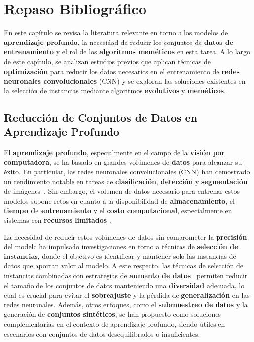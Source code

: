 
\chapter{Repaso Bibliográfico}\label{ch:repaso-bibliografico}
En este capítulo se revisa la literatura relevante en torno a los modelos de \textbf{aprendizaje profundo}, la
necesidad de reducir los conjuntos de \textbf{datos de entrenamiento} y el rol de los \textbf{algoritmos meméticos} en
esta tarea.
A lo largo de este capítulo, se analizan estudios previos que aplican técnicas de \textbf{optimización} para reducir
los datos necesarios en el entrenamiento de \textbf{redes neuronales convolucionales} (CNN) y se exploran las
soluciones existentes en la selección de instancias mediante algoritmos \textbf{evolutivos} y \textbf{meméticos}.


\section{Reducción de Conjuntos de Datos en Aprendizaje Profundo}
\label{sec:reduccion-de-conjuntos-de-datos-en-aprendizaje-profundo}
El \textbf{aprendizaje profundo}, especialmente en el campo de la \textbf{visión por computadora}, se ha basado en
grandes volúmenes de \textbf{datos} para alcanzar su éxito.
En particular, las redes neuronales convolucionales (CNN) han demostrado un rendimiento notable en tareas de
\textbf{clasificación}, \textbf{detección} y \textbf{segmentación} de imágenes~\cite{goodfellowDeepLearning2016}.
Sin embargo, el volumen de datos necesario para entrenar estos modelos supone retos en cuanto a la disponibilidad de
\textbf{almacenamiento}, el \textbf{tiempo de entrenamiento} y el \textbf{costo computacional}, especialmente en
sistemas con \textbf{recursos limitados}~\cite{lecunDeepLearning2015}.


La necesidad de reducir estos volúmenes de datos sin comprometer la \textbf{precisión} del modelo ha impulsado
investigaciones en torno a técnicas de \textbf{selección de instancias}, donde el objetivo es identificar y mantener
solo las instancias de datos que aportan valor al modelo.
A este respecto, las técnicas de selección de instancias combinadas con estrategias de
\textbf{aumento de datos}~\cite{shortenSurveyImageData2019} permiten reducir el tamaño de los conjuntos de datos
manteniendo una \textbf{diversidad} adecuada, lo cual es crucial para evitar el \textbf{sobreajuste} y la pérdida de
\textbf{generalización} en las redes neuronales.
Además, otros enfoques, como el \textbf{submuestreo de datos} y la generación de \textbf{conjuntos sintéticos}, se han
propuesto como soluciones complementarias en el contexto de aprendizaje profundo, siendo útiles en escenarios con
conjuntos de datos desequilibrados o insuficientes.


